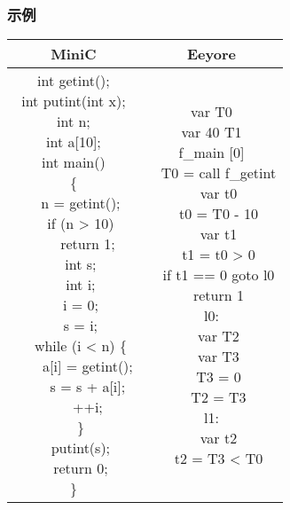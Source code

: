 \subsubsection{示例}
\begin{table}[H]
    \centering
    \begin{typewriterfont}
    \begin{tabular}{|c|c|}
        \hline
        MiniC & Eeyore \\
        \hline
        \makecell[l]{
int getint();\\
int putint(int x);\\
int n;\\
int a[10];\\
int main()\\
\{\\
\ \ n = getint();\\
\ \ if (n > 10)\\
\ \ \ \ return 1;\\
\ \ int s;\\
\ \ int i;\\
\ \ i = 0;\\
\ \ s = i;\\
\ \ while (i < n) \{\\
\ \ \ \ a[i] = getint();\\
\ \ \ \ s = s + a[i];\\
\ \ \ \ ++i;\\
\ \ \}\\
\ \ putint(s);\\
\ \ return 0;\\
\}
        } & \makecell[l]{
var T0\\
var 40 T1\\
f\_main [0]\\
\ \ T0 = call f\_getint\\
\ \ var t0\\
\ \ t0 = T0 - 10\\
\ \ var t1\\
\ \ t1 = t0 > 0\\
\ \ if t1 == 0 goto l0\\
\ \ return 1\\
l0:\\
\ \ var T2\\
\ \ var T3\\
\ \ T3 = 0\\
\ \ T2 = T3\\
l1:\\
\ \ var t2\\
\ \ t2 = T3 < T0\\
}
\end{tabular}
\end{typewriterfont}
\end{table}
